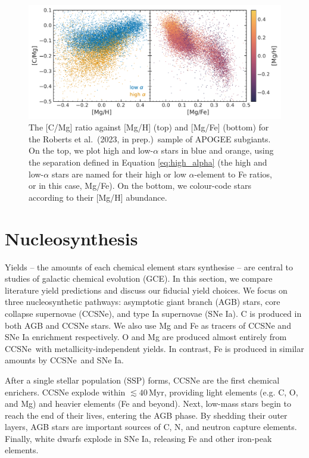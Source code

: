 \documentclass[fleqn,usenatbib]{mnras}
\newcommand{\citetjack}{Roberts et al.~(2023, in prep.)}
\newcommand{\agb}{AGB}
\newcommand{\apogee}{APOGEE}
\newcommand{\cc}{CCSNe}
\newcommand{\ia}{SNe Ia}
\begin{document}
\begin{figure}
    \centering
    \includegraphics{subgiants.pdf}
    \caption{The [C/Mg] ratio against [Mg/H] (top) and [Mg/Fe] (bottom) for the \citetjack~sample of \apogee{} subgiants. On the top, we plot high and low-$\alpha$ stars in blue and orange, using the separation defined in Equation \ref{eq:high_alpha} (the high and low-$\alpha$ stars are named for their high or low $\alpha$-element to Fe ratios, or in this case, Mg/Fe). On the bottom, we colour-code stars according to their [Mg/H] abundance.} \label{fig:subgiants}
\end{figure}








\section{Nucleosynthesis}

Yields -- the amounts of each chemical element stars synthesise -- are central to studies of galactic chemical evolution (GCE). 
In this section, we compare literature yield predictions and discuss our fiducial yield choices. 
We focus on three nucleosynthetic pathways: asymptotic giant branch (\agb{}) stars, core collapse supernovae (\cc{}), and type Ia supernovae (\ia{}).
C is produced in both \agb{} and \cc{} stars.
We also use Mg and Fe as tracers of \cc{} and \ia{} enrichment respectively. 
O and Mg are produced almost entirely from \cc\ with metallicity-independent yields. In contrast, Fe is produced in similar amounts by \cc\ and \ia.

After a single stellar population (SSP)\footnotemark{} forms, \cc{} are the first chemical enrichers. \cc{} explode within $\lesssim 40$\,Myr, providing light elements (e.g. C, O, and Mg) and heavier elements (Fe and beyond). Next, low-mass stars begin to reach the end of their lives, entering the \agb{} phase. By shedding their outer layers, \agb{} stars are important sources of C, N, and neutron capture elements.  Finally, white dwarfs explode in \ia{}, releasing Fe and other iron-peak elements.
\end{document}
